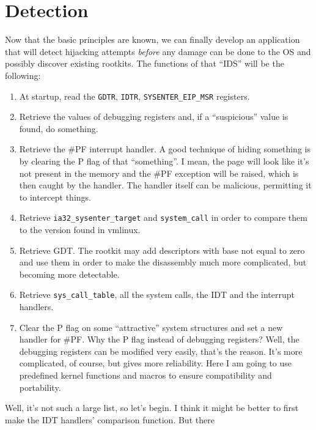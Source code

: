 \documentclass[12pt]{article}
\begin{document}
\section{Detection}
Now that the basic principles are known, we can finally develop an
application that will detect hijacking attempts \emph{before} any
damage can be done to the OS and possibly discover existing
rootkits. The functions of that ``IDS'' will be the following:
\begin{enumerate}
  \item At startup, read the \verb!GDTR!, \verb!IDTR!,
    \verb!SYSENTER_EIP_MSR!  registers.
    
  \item Retrieve the values of debugging registers and, if
    a ``suspicious'' value is found, do something.
    
  \item Retrieve the \#PF interrupt handler. A good technique of hiding
    something is by clearing the P flag of that ``something''. I mean,
    the page will look like it's not present in the memory and the
    \#PF exception will be raised, which is then caught by the
    handler. The handler itself can be malicious, permitting it to
    intercept things.

  \item Retrieve \verb!ia32_sysenter_target! and \verb!system_call! in
    order to compare them to the version found in vmlinux.

  \item Retrieve GDT. The rootkit may add descriptors with base not
    equal to zero and use them in order to make the disassembly much
    more complicated, but becoming more detectable.

  \item Retrieve \verb!sys_call_table!, all the system calls, the IDT
    and the interrupt handlers.

  \item Clear the P flag on some ``attractive'' system structures and
    set a new handler for \#PF. Why the P flag instead of debugging
    registers? Well, the debugging registers can be modified very
    easily, that's the reason. It's more complicated, of course, but
    gives more reliability. Here I am going to use predefined kernel
    functions and macros to ensure compatibility and portability.
\end{enumerate}
Well, it's not such a large list, so let's begin. I think it might be
better to first make the IDT handlers' comparison function. But there
\end{document}
